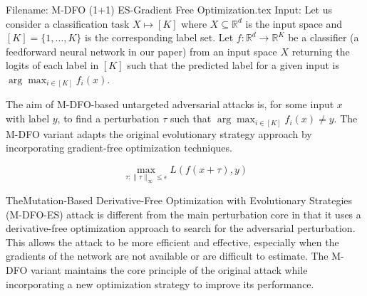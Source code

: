 Filename: M-DFO (1+1) ES-Gradient Free Optimization.tex
Input: Let us consider a classification task $X \mapsto [K]$ where $X \subseteq \mathbb{R}^d$ is the input space and $[K] = \{1, \ldots, K\}$ is the corresponding label set. Let $f : \mathbb{R}^d \to \mathbb{R}^K$ be a classifier (a feedforward neural network in our paper) from an input space $X$ returning the logits of each label in $[K]$ such that the predicted label for a given input is $\arg \max_{i \in [K]} f_i(x)$.

The aim of M-DFO-based untargeted adversarial attacks is, for some input $x$ with label $y$, to find a perturbation $\tau$ such that $\arg \max_{i \in [K]} f_i(x) \neq y$. The M-DFO variant adapts the original evolutionary strategy approach by incorporating gradient-free optimization techniques.

\[
\max_{\tau: \|\tau\|_\infty \leq \epsilon} L(f(x + \tau), y)
\]

TheMutation-Based Derivative-Free Optimization with Evolutionary Strategies (M-DFO-ES) attack is different from the main perturbation core in that it uses a derivative-free optimization approach to search for the adversarial perturbation. This allows the attack to be more efficient and effective, especially when the gradients of the network are not available or are difficult to estimate. The M-DFO variant maintains the core principle of the original attack while incorporating a new optimization strategy to improve its performance.